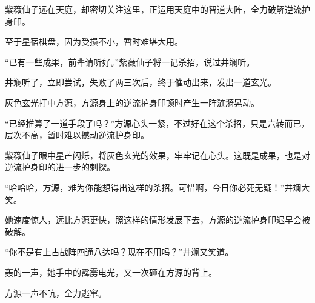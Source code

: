 \begin{this_body}
紫薇仙子远在天庭，却密切关注这里，正运用天庭中的智道大阵，全力破解逆流护身印。

至于星宿棋盘，因为受损不小，暂时难堪大用。

“已有一些成果，前辈请听好。”紫薇仙子将一记杀招，说过井斓听。

井斓听了，立即尝试，失败了两三次后，终于催动出来，发出一道玄光。

灰色玄光打中方源，方源身上的逆流护身印顿时产生一阵涟漪晃动。

“已经推算了一道手段了吗？”方源心头一紧，不过好在这个杀招，只是六转而已，层次不高，暂时难以撼动逆流护身印。

紫薇仙子眼中星芒闪烁，将灰色玄光的效果，牢牢记在心头。这既是成果，也是对逆流护身印的进一步的刺探。

“哈哈哈，方源，难为你能想得出这样的杀招。可惜啊，今日你必死无疑！”井斓大笑。

她速度惊人，远比方源更快，照这样的情形发展下去，方源的逆流护身印迟早会被破解。

“你不是有上古战阵四通八达吗？现在不用吗？”井斓又笑道。

轰的一声，她手中的霹雳电光，又一次砸在方源的背上。

方源一声不吭，全力逃窜。

\end{this_body}

